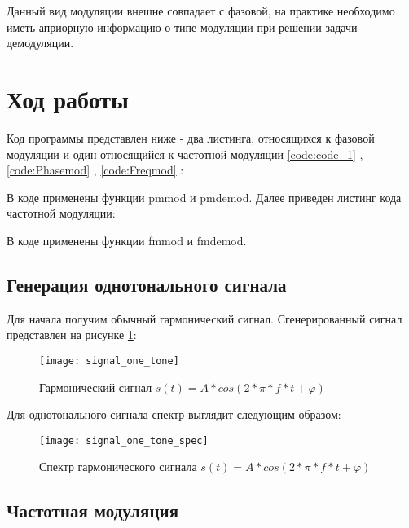 Данный вид модуляции внешне совпадает с фазовой, на практике необходимо иметь априорную информацию о типе модуляции при решении задачи демодуляции.


\section{Ход работы}
Код программы представлен ниже - два листинга, относящихся к фазовой модуляции и один относящийся к частотной модуляции \ref{code:code_1} , \ref{code:Phasemod} , \ref{code:Freqmod} : 


В коде применены функции pmmod и pmdemod.
Далее приведен листинг кода частотной модуляции:

В коде применены функции fmmod и fmdemod.

\subsection{Генерация однотонального сигнала}
Для начала получим обычный гармонический сигнал. Сгенерированный сигнал представлен на рисунке \ref{pic:signal_one_tone}:
\begin{figure}[H]
	\begin{center}
		\texttt{[image: signal\_one\_tone]}
		\caption{Гармонический сигнал $s(t) = A*cos(2*\pi * f*t + \varphi)$} 
		\label{pic:signal_one_tone} %
	\end{center}
\end{figure}
Для однотонального сигнала спектр выглядит следующим образом:
\begin{figure}[H]
	\begin{center}
		\texttt{[image: signal\_one\_tone\_spec]}
		\caption{Спектр гармонического сигнала $s(t) = A*cos(2*\pi * f*t + \varphi)$} 
		\label{pic:signal_one_tone_spec} %
	\end{center}
\end{figure}

\subsection{Частотная модуляция}

